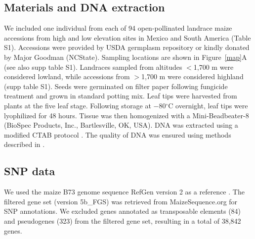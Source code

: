 \subsection*{Materials and DNA extraction}
We included one individual from each of 94 open-pollinated landrace maize accessions from high and low elevation sites in Mexico and South America (Table S1).  Accessions were provided by USDA germplasm repository or kindly donated by Major Goodman (NCState).  
Sampling locations are shown in Figure~\ref{map}A (see also supp table S1).  
%
%
Landraces sampled from altitudes $<$1,700 m were considered lowland, while accessions from $>$1,700 m were considered highland (supp table S1).  
%
%
Seeds were germinated on filter paper following fungicide treatment and grown in standard potting mix.  Leaf tips were harvested from plants at the five leaf stage.  Following storage at $-80{}^\circ$C overnight, leaf tips were lyophilized for 48 hours.  Tissue was then homogenized with a Mini-Beadbeater-8 (BioSpec Products, Inc., Bartlesville, OK, USA).  DNA was extracted using a modified CTAB protocol \cite[]{CTAB}.  The quality of DNA was ensured using methods described in \cite{vanHeerwaarden_2011_21189301}.

\subsection*{SNP data}
We used the maize B73 genome sequence RefGen version 2 as a reference \cite[]{Schnable_2009_19965430}.  
The filtered gene set (version 5b\_FGS) was retrieved from MaizeSequence.org for SNP annotations.  
%
%
We excluded genes annotated as transposable elements (84) and pseudogenes (323) from the filtered gene set, resulting in a total of 38,842 genes.

